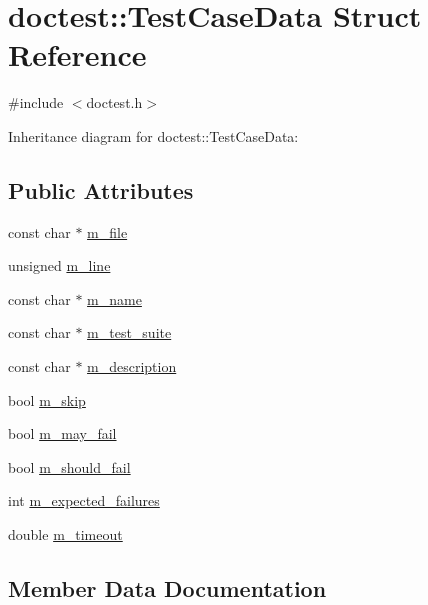 \hypertarget{structdoctest_1_1_test_case_data}{}\section{doctest\+:\+:Test\+Case\+Data Struct Reference}
\label{structdoctest_1_1_test_case_data}


{\ttfamily \#include $<$doctest.\+h$>$}



Inheritance diagram for doctest\+:\+:Test\+Case\+Data\+:
\subsection*{Public Attributes}
\begin{DoxyCompactItemize}
\item 
const char $\ast$ \hyperlink{structdoctest_1_1_test_case_data_a2fd47118d7424ba2e3c142b18d47167f}{m\+\_\+file}
\item 
unsigned \hyperlink{structdoctest_1_1_test_case_data_aaabb9765e7aa39416c058a9cbccef57f}{m\+\_\+line}
\item 
const char $\ast$ \hyperlink{structdoctest_1_1_test_case_data_a0cb34895130be773e624526d68e5b2cd}{m\+\_\+name}
\item 
const char $\ast$ \hyperlink{structdoctest_1_1_test_case_data_ae264da66ff0e88a34c467d364dd18840}{m\+\_\+test\+\_\+suite}
\item 
const char $\ast$ \hyperlink{structdoctest_1_1_test_case_data_abd855851b4b9edbaf46c3458abc1ba80}{m\+\_\+description}
\item 
bool \hyperlink{structdoctest_1_1_test_case_data_a0c2353bd3fd8c2fa84d34ab4e973e038}{m\+\_\+skip}
\item 
bool \hyperlink{structdoctest_1_1_test_case_data_a887b70bf52f74724f0d7fe99d43a8783}{m\+\_\+may\+\_\+fail}
\item 
bool \hyperlink{structdoctest_1_1_test_case_data_a037f6dfb931aff9c9b17f31203a3987e}{m\+\_\+should\+\_\+fail}
\item 
int \hyperlink{structdoctest_1_1_test_case_data_a6c5995f53ad39769bf06600e562ea9eb}{m\+\_\+expected\+\_\+failures}
\item 
double \hyperlink{structdoctest_1_1_test_case_data_a8cab4a7998b486bafa81498f93dd4d91}{m\+\_\+timeout}
\end{DoxyCompactItemize}


\subsection{Member Data Documentation}
\mbox{\label{structdoctest_1_1_test_case_data_abd855851b4b9edbaf46c3458abc1ba80}} 
